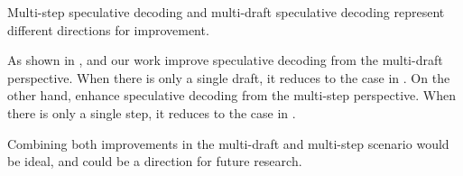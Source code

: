 Multi-step speculative decoding and multi-draft speculative decoding represent different directions for improvement.

As shown in , \citet{sun2024spectr,khisti2024importanceweighted} and our work improve speculative decoding from the multi-draft perspective. When there is only a single draft, it reduces to the case in \citet{leviathan2023fast,chen2023accelerating}. On the other hand, \citet{sun2024optimal,huaccelerated,sunblock} enhance speculative decoding from the multi-step perspective. When there is only a single step, it reduces to the case in \citet{leviathan2023fast,chen2023accelerating}.

Combining both improvements in the multi-draft and multi-step scenario would be ideal, and could be a direction for future research.
